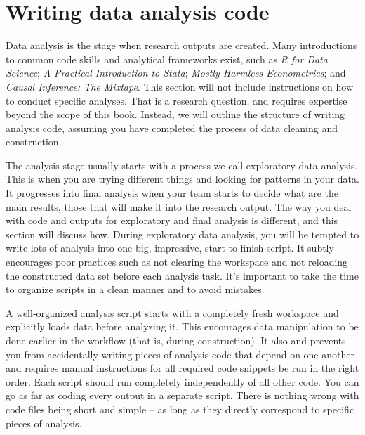 
\section{Writing data analysis code}

Data analysis is the stage when research outputs are created. 
Many introductions to common code skills and analytical frameworks exist, such as
\textit{R for Data Science};
\textit{A Practical Introduction to Stata};
\textit{Mostly Harmless Econometrics}; 
and \textit{Causal Inference: The Mixtape}.
This section will not include instructions on how to conduct specific analyses.
That is a research question, and requires expertise beyond the scope of this book.
Instead, we will outline the structure of writing analysis code,
assuming you have completed the process of data cleaning and construction.

The analysis stage usually starts with a process we call exploratory data analysis.
This is when you are trying different things and looking for patterns in your data. 
It progresses into final analysis when your team starts to decide what are the main results, those that will make it into the research output.
The way you deal with code and outputs for exploratory and final analysis is different, and this section will discuss how.
During exploratory data analysis, you will be tempted to write lots of analysis into one big, impressive, start-to-finish script. 
It subtly encourages poor practices such as not clearing the workspace and not reloading the constructed data set before each analysis task. 
It's important to take the time to organize scripts in a clean manner and to avoid mistakes.

A well-organized analysis script starts with a completely fresh workspace and explicitly loads data before analyzing it.
This encourages data manipulation to be done earlier in the workflow (that is, during construction).
It also and prevents you from accidentally writing pieces of analysis code that depend on one another and requires manual instructions for all required code snippets be run in the right order.
Each script should run completely independently of all other code.
You can go as far as coding every output in a separate script.
There is nothing wrong with code files being short and simple -- as long as they directly correspond to specific pieces of analysis.


